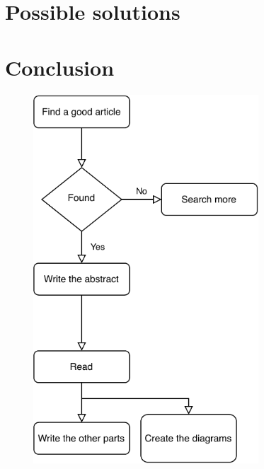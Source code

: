 \documentclass[10pt,twoside,english,a4paper]{article}
\begin{document}
\section{Possible solutions}

\section{Conclusion}










\begin{figure}
\includegraphics[width=0.75\textwidth]{images/flowchart-crop.pdf}
\end{figure}
\end{document}
